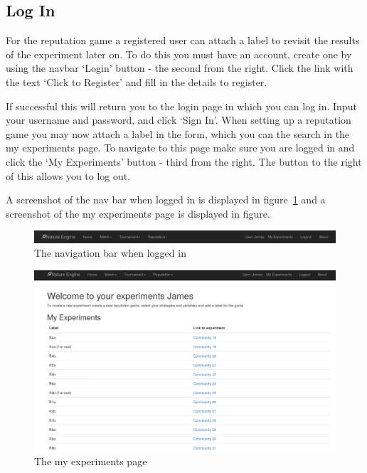 \documentclass[]{final_report}
\begin{document}
\subsection{Log In}
For the reputation game a registered user can attach a label to revisit the results of the experiment later on. To do this you must have an account, create one by using the navbar `Login' button - the second from the right. Click the link with the text `Click to Register' and fill in the details to register.\par
If successful this will return you to the login page in which you can log in. Input your username and password, and click `Sign In'. When setting up a reputation game you may now attach a label in the form, which you can the search in the my experiments page. To navigate to this page make sure you are logged in and click the `My Experiments' button - third from the right. The button to the right of this allows you to log out.\par 
A screenshot of the nav bar when logged in is displayed in figure~\ref{fig:navbar2} and a screenshot of the my experiments page is displayed in figure.
\begin{figure}
	\includegraphics[width=\textwidth]{NavBar2.png}
	\caption{The navigation bar when logged in}
	\label{fig:navbar2}
\end{figure}
\begin{figure}
	\includegraphics[width=\textwidth]{MyExperiments.png}
	\caption{The my experiments page}
	\label{fig:my_experiments}
\end{figure}
\end{document}

